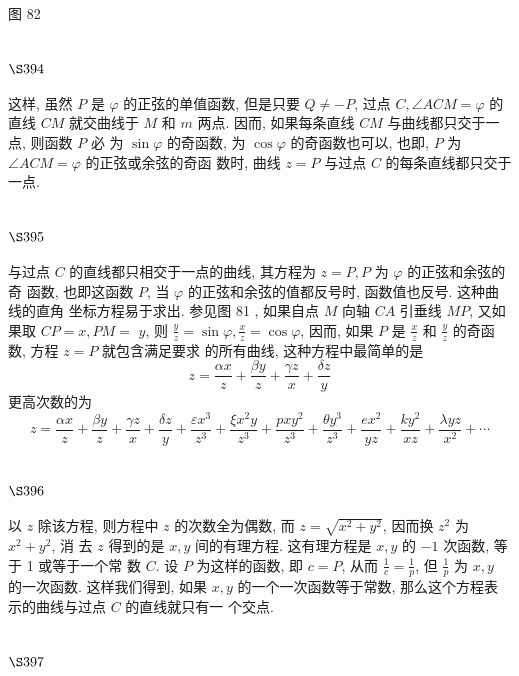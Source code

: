 图 82

\section{$\S 394$}

这样, 虽然 $P$ 是 $\varphi$ 的正弦的单值函数, 但是只要 $Q \neq-P$, 过点 $C, \angle A C M=\varphi$ 的直线 $C M$ 就交曲线于 $M$ 和 $m$ 两点. 因而, 如果每条直线 $C M$ 与曲线都只交于一点, 则函数 $P$ 必 为 $\sin \varphi$ 的奇函数, 为 $\cos \varphi$ 的奇函数也可以, 也即, $P$ 为 $\angle A C M=\varphi$ 的正弦或余弦的奇函 数时, 曲线 $z=P$ 与过点 $C$ 的每条直线都只交于一点.

\section{$\S 395$}

与过点 $C$ 的直线都只相交于一点的曲线, 其方程为 $z=P, P$ 为 $\varphi$ 的正弦和余弦的奇 函数, 也即这函数 $P$, 当 $\varphi$ 的正弦和余弦的值都反号时, 函数值也反号. 这种曲线的直角 坐标方程易于求出. 参见图 81 , 如果自点 $M$ 向轴 $C A$ 引垂线 $M P$, 又如果取 $C P=x, P M=$ $y$, 则 $\frac{y}{z}=\sin \varphi, \frac{x}{z}=\cos \varphi$, 因而, 如果 $P$ 是 $\frac{x}{z}$ 和 $\frac{y}{z}$ 的奇函数, 方程 $z=P$ 就包含满足要求 的所有曲线, 这种方程中最简单的是
\[
z=\frac{\alpha x}{z}+\frac{\beta y}{z}+\frac{\gamma z}{x}+\frac{\delta z}{y}
\]
更高次数的为
\[
z=\frac{\alpha x}{z}+\frac{\beta y}{z}+\frac{\gamma z}{x}+\frac{\delta z}{y}+\frac{\varepsilon x^{3}}{z^{3}}+\frac{\xi x^{2} y}{z^{3}}+\frac{p x y^{2}}{z^{3}}+\frac{\theta y^{3}}{z^{3}}+\frac{e x^{2}}{y z}+\frac{k y^{2}}{x z}+\frac{\lambda y z}{x^{2}}+\cdots
\]
\section{$\S 396$}

以 $z$ 除该方程, 则方程中 $z$ 的次数全为偶数, 而 $z=\sqrt{x^{2}+y^{2}}$, 因而换 $z^{2}$ 为 $x^{2}+y^{2}$, 消 去 $z$ 得到的是 $x, y$ 间的有理方程. 这有理方程是 $x, y$ 的 $-1$ 次函数, 等于 1 或等于一个常 数 $C$. 设 $P$ 为这样的函数, 即 $c=P$, 从而 $\frac{1}{c}=\frac{1}{p}$, 但 $\frac{1}{p}$ 为 $x, y$ 的一次函数. 这样我们得到, 如果 $x, y$ 的一个一次函数等于常数, 那么这个方程表示的曲线与过点 $C$ 的直线就只有一 个交点.

\section{$\S 397$}

